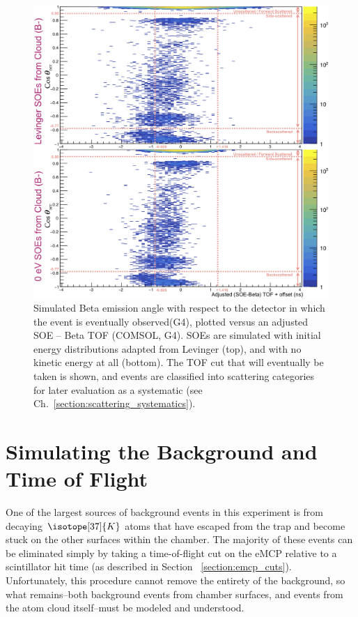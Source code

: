 \begin{figure}[h!tb]
	\centering
	\includegraphics[width=.999\linewidth]
	{Figures/fig_soe_tof_vs_costheta.png}
	\caption[Simulated Beta emission angle w.r.t. the detector vs adjusted SOE--Beta TOF]{Simulated Beta emission angle with respect to the detector in which the event is eventually observed(G4), plotted versus an adjusted SOE -- Beta TOF (COMSOL, G4).  SOEs are simulated with initial energy distributions adapted from Levinger (top), and with no kinetic energy at all (bottom).  
The TOF cut that will eventually be taken is shown, and events are classified into scattering categories for later evaluation as a systematic (see Ch.~\ref{section:scattering_systematics}).  }
	\label{fig:soe_tof_vs_costheta}
\end{figure}






\section{Simulating the Background and Time of Flight}
\label{sec:tof_bg}
One of the largest sources of background events in this experiment is from decaying $\isotope[37]{K}$ atoms that have escaped from the trap and become stuck on the other surfaces within the chamber.  The majority of these events can be eliminated simply by taking a time-of-flight cut on the eMCP relative to a scintillator hit time (as described in Section ~\ref{section:emcp_cuts}).  Unfortunately, this procedure cannot remove the entirety of the background, so what remains--both background events from chamber surfaces, and events from the atom cloud itself--must be modeled and understood.  

